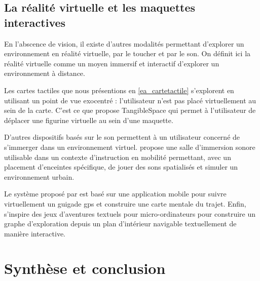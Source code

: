 \subsection{La réalité virtuelle et les maquettes interactives}



En l'abscence de vision, il existe d'autres modalités permettant d'explorer un environnement en réalité virtuelle, par le toucher et par le son. On définit ici la réalité virtuelle comme un  moyen immersif et interactif d'explorer un environnement à distance.

\newpar{}

Les cartes tactiles que nous présentions en \ref{ea_cartetactile} s'explorent en utilisant un point de vue exocentré : l'utilisateur n'est pas placé virtuellement au sein de la carte. C'est ce que propose TangibleSpace \cite{Mulet2020} qui permet à l'utilisateur de déplacer une figurine virtuelle au sein d'une maquette.

D'autres dispositifs basés sur le son permettent à un utilisateur concerné de s'immerger dans un environnement virtuel. \cite{Thome2021} propose une salle d'immersion sonore utilisable dans un contexte d'instruction en mobilité permettant, avec un placement d'enceintes spécifique, de jouer des sons spatialisés et simuler un environnement urbain. 

Le système proposé par \cite{Guerreiro2017} est basé sur une application mobile pour suivre virtuellement un guigade \gls{gps} et construire une carte mentale du trajet. Enfin, \cite{Arabsheibani2023} s'inspire des jeux d'aventures textuels pour micro-ordinateurs pour construire un graphe d'exploration depuis un plan d'intérieur navigable textuellement de manière interactive.

\section{Synthèse et conclusion}

